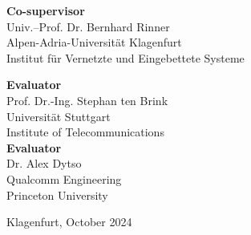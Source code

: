 \begin{titlepage}
\begin{multicols}{2}
    \noindent \large{\textbf{Co-supervisor}}\\
    \noindent Univ.--Prof. Dr. Bernhard Rinner\\
    \noindent \normalsize{Alpen-Adria-Universit{\"a}t Klagenfurt}\\
    \noindent \normalsize{Institut f{\"u}r Vernetzte und Eingebettete Systeme}\\
\end{multicols}
\vspace{1mm}

\begin{multicols}{2}
    \noindent \large{\textbf{Evaluator}}\\
    \noindent Prof. Dr.-Ing. Stephan ten Brink\\
    \noindent \normalsize{Universit{\"a}t Stuttgart}\\
    \noindent \normalsize{Institute of Telecommunications}\\
    
    \noindent \large{\textbf{Evaluator}}\\
    \noindent Dr. Alex Dytso\\
    \noindent \normalsize{Qualcomm Engineering}\\
    \noindent \normalsize{Princeton University}\\


\end{multicols}

\vspace{6mm}
\centering\large{Klagenfurt, October 2024}

\end{titlepage}
	

